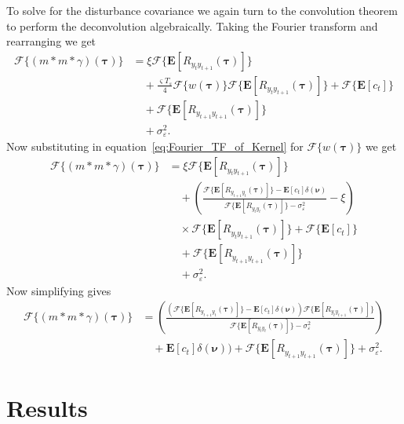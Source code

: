 \documentclass[conference,onecolumn]{IEEEtran}
\begin{document}
To solve for the disturbance covariance we again turn to the convolution theorem to perform the deconvolution algebraically. Taking the Fourier transform and rearranging we get
\begin{align}
	\mathcal{F}\{(m\ast m \ast \gamma)(\boldsymbol\tau)\} &= \xi \mathcal{F}\{\mathbf{E}[R_{y_ty_{t+1}}(\boldsymbol{\tau})]\} \nonumber \\
	&\quad + \frac{\varsigma T_s}{4} \mathcal{F}\{w(\boldsymbol{\tau})\}\mathcal{F}\{ \mathbf{E}[R_{y_ty_{t+1}}(\boldsymbol\tau)]\}  + \mathcal{F}\{\mathbf{E}[c_t]\} \nonumber \\
	&\quad + \mathcal{F}\{\mathbf{E}[R_{y_{t+1}y_{t+1}}(\boldsymbol{\tau})]\} \nonumber \\ 
	&\quad+\sigma_{\varepsilon}^2.
\end{align}
Now substituting in equation~\ref{eq:Fourier_TF_of_Kernel} for $\mathcal{F}\{w(\boldsymbol{\tau})\}$ we get
\begin{align}
	\mathcal{F}\{(m\ast m \ast \gamma)(\boldsymbol\tau)\} &= \xi \mathcal{F}\{\mathbf{E}[R_{y_ty_{t+1}}(\boldsymbol{\tau})]\} \nonumber \\
	&\quad + (\frac{\mathcal{F}\{\mathbf{E}[R_{y_{t+1}y_t}(\boldsymbol{\tau})]\} - \mathbf{E}\left[c_t\right]\delta(\boldsymbol{\nu})}{\mathcal{F}\{\mathbf{E}\left[R_{y_ty_t}(\boldsymbol\tau)\right]\} - \sigma_{\varepsilon}^2 } - \xi) \nonumber\\
	&\quad\times\mathcal{F}\{ \mathbf{E}[R_{y_ty_{t+1}}(\boldsymbol\tau)]\}  + \mathcal{F}\{\mathbf{E}[c_t]\} \nonumber \\
	&\quad + \mathcal{F}\{\mathbf{E}[R_{y_{t+1}y_{t+1}}(\boldsymbol{\tau})]\} \nonumber \\ 
	&\quad+\sigma_{\varepsilon}^2.
\end{align}
Now simplifying gives
\begin{align}
	\mathcal{F}\{(m\ast m \ast \gamma)(\boldsymbol\tau)\} &= (\frac{(\mathcal{F}\{\mathbf{E}[R_{y_{t+1}y_t}(\boldsymbol{\tau})]\} - \mathbf{E}\left[c_t\right]\delta(\boldsymbol{\nu}))\mathcal{F}\{ \mathbf{E}[R_{y_ty_{t+1}}(\boldsymbol\tau)]\}}{\mathcal{F}\{\mathbf{E}\left[R_{y_ty_t}(\boldsymbol\tau)\right]\} - \sigma_{\varepsilon}^2 }) \nonumber\\
	&\quad + \mathbf{E}\left[c_t\right]\delta(\boldsymbol{\nu})) + \mathcal{F}\{\mathbf{E}[R_{y_{t+1}y_{t+1}}(\boldsymbol{\tau})]\} +\sigma_{\varepsilon}^2.	
\end{align}
\section{Results}
\end{document}
